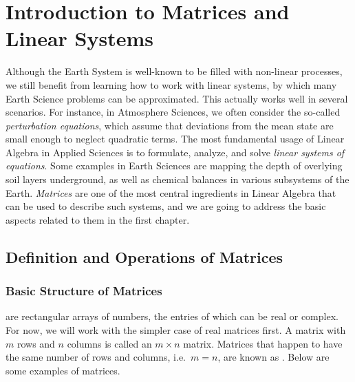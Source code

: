 \chapter{Introduction to Matrices and Linear Systems}

Although the Earth System is well-known to be filled with non-linear processes, we still benefit from learning how to work with linear systems, by which many Earth Science problems can be approximated. This actually works well in several scenarios. For instance, in Atmosphere Sciences, we often consider the so-called \textit{perturbation equations}, which assume that deviations from the mean state are small enough to neglect quadratic terms. The most fundamental usage of Linear Algebra in Applied Sciences is to formulate, analyze, and solve \textit{linear systems of equations}. Some examples in Earth Sciences are mapping the depth of overlying soil layers underground, as well as chemical balances in various subsystems of the Earth. \textit{Matrices} are one of the most central ingredients in Linear Algebra that can be used to describe such systems, and we are going to address the basic aspects related to them in the first chapter.

\section{Definition and Operations of Matrices}
\label{section:matrixdefn}

\subsection{Basic Structure of Matrices}
 are rectangular arrays of numbers, the entries of which can be real or complex. For now, we will work with the simpler case of real matrices first. A matrix with $m$ rows and $n$ columns is called an $m \times n$ matrix. Matrices that happen to have the same number of rows and columns, i.e.\ $m = n$, are known as . Below are some examples of matrices.

